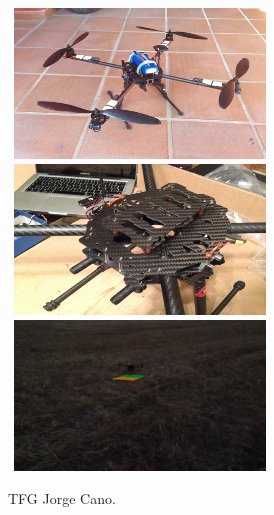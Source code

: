 \begin{figure}[H]
 \centering
    \includegraphics[width=7cm,height=4cm]{imgs/JorgeCano1_1.jpg}
    \includegraphics[width=7cm,height=4cm]{imgs/JorgeCano2_1.jpg}
    \includegraphics[width=7cm,height=4cm]{imgs/JorgeCano3_1.png}
 \caption{TFG Jorge Cano.}
 \label{f:JorgeCano}
\end{figure} 




